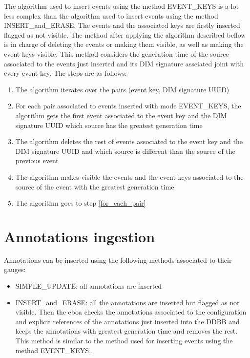 The algorithm used to insert events using the method EVENT\_KEYS is a lot less complex than the algorithm used to insert events using the method INSERT\_and\_ERASE.
The events and the associated keys are firstly inserted flagged as not visible. The method after applying the algorithm described bellow is in charge of deleting the events or making them visible, as well as making the event keys visible.
This method considers the generation time of the source associated to the events just inserted and its DIM signature assciated joint with every event key.
The steps are as follows:

\begin{enumerate}

\item The algorithm iterates over the pairs (event key, DIM signature UUID)
\item \label{for_each_pair} For each pair associated to events inserted with mode EVENT\_KEYS, the algorithm gets the first event associated to the event key and the DIM signature UUID which source has the greatest generation time
\item The algorithm deletes the rest of events associated to the event key and the DIM signature UUID and which source is different than the source of the previous event
\item The algorithm makes visible the events and the event keys associated to the source of the event with the greatest generation time
\item The algorithm goes to step \ref{for_each_pair}
\end{enumerate}

\section{Annotations ingestion}

Annotations can be inserted using the following methods associated to their gauges:

\begin{itemize}
\item SIMPLE\_UPDATE: all annotations are inserted
\item INSERT\_and\_ERASE: all the annotations are inserted but flagged as not visible. Then the \acrshort{eboa} checks the annotations associated to the configuration and explicit references of the annotations just inserted into the DDBB and keeps the annotations with greatest generation time and removes the rest. This method is similar to the method used for inserting events using the method EVENT\_KEYS.
\end{itemize}

